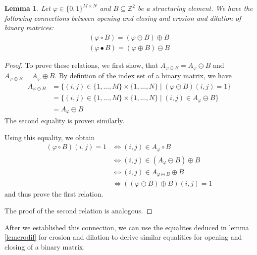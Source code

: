 \documentclass[a4paper,12pt]{article}
\theoremstyle{plain}
\newtheorem{lemma}[theorem]{Lemma}
\theoremstyle{definition}
\theoremstyle{remark}
\begin{document}
\begin{lemma}
	Let $\varphi \in \{ 0, 1 \}^{M \times N}$ and $B \subseteq \mathbb{Z}^2$ be a structuring element. We have the following connections between opening and closing and erosion and dilation of binary matrices:
	\begin{align}
		(\varphi \circ B) = (\varphi \ominus B) \oplus B \\
		(\varphi \bullet B) = (\varphi \oplus B) \ominus B
	\end{align}
\end{lemma}
\begin{proof}
	To prove these relations, we first show, that $A_{\varphi \ominus B} = A_\varphi \ominus B$ and $A_{\varphi \oplus B} = A_\varphi \oplus B$. By defintion of the index set of a binary matrix, we have
	\begin{align*}
		A_{\varphi \ominus B} &= \{ (i, j) \in \{ 1, \dots, M \} \times \{ 1, \dots, N \} \mid (\varphi \ominus B)(i, j) = 1 \} \\
		&= \{ (i, j) \in \{ 1, \dots, M \} \times \{ 1, \dots, N \} \mid (i, j) \in A_\varphi \ominus B \} \\
		&= A_\varphi \ominus B
	\end{align*}
	The second equality is proven similarly.
	
	Using this equality, we obtain
	\begin{align*}
		(\varphi \circ B)(i, j) = 1 &\Leftrightarrow (i, j) \in A_\varphi \circ B \\
		&\Leftrightarrow (i, j) \in (A_\varphi \ominus B) \oplus B \\
		&\Leftrightarrow (i, j) \in A_{\varphi \ominus B} \oplus B \\
		&\Leftrightarrow ((\varphi \ominus B) \oplus B)(i, j) = 1
	\end{align*}
	and thus prove the first relation.
	
	The proof of the second relation is analogous.
\end{proof}

After we established this connection, we can use the equalites deduced in lemma \ref{lemerodil} for erosion and dilation to derive similar equalities for opening and closing of a binary matrix.
\end{document}
